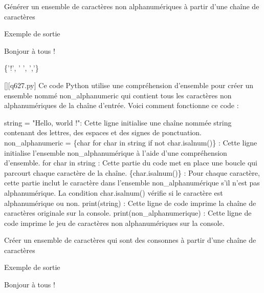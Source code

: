         \question
        Générer un ensemble de caractères non alphanumériques à partir d'une chaîne de caractères

Exemple de sortie

Bonjour à tous !

\{'!', ' ', ','\}
        \par
        \begin{solution}
            \renewcommand{\nomfichier}{q627.py}
            \pythonfile{\chemincode \nomfichier}[][\nomfichier]
            Ce code Python utilise une compréhension d'ensemble pour créer un ensemble nommé non\_alphanumeric qui contient tous les caractères non alphanumériques de la chaîne d'entrée. Voici comment fonctionne ce code :

    string = "Hello, world !": Cette ligne initialise une chaîne nommée string contenant des lettres, des espaces et des signes de ponctuation.
    non\_alphanumeric = \{char for char in string if not char.isalnum()\} : Cette ligne initialise l'ensemble non\_alphanumérique à l'aide d'une compréhension d'ensemble.
        for char in string : Cette partie du code met en place une boucle qui parcourt chaque caractère de la chaîne.
        \{char.isalnum()\} : Pour chaque caractère, cette partie inclut le caractère dans l'ensemble non\_alphanumérique s'il n'est pas alphanumérique. La condition char.isalnum() vérifie si le caractère est alphanumérique ou non.
    print(string) : Cette ligne de code imprime la chaîne de caractères originale sur la console.
    print(non\_alphanumerique) : Cette ligne de code imprime le jeu de caractères non alphanumériques sur la console.
        \end{solution}
        

        \question
        Créer un ensemble de caractères qui sont des consonnes à partir d'une chaîne de caractères

Exemple de sortie

Bonjour à tous !


